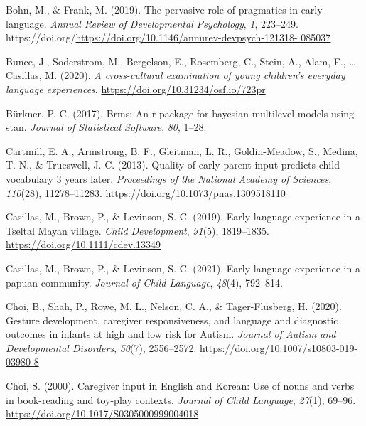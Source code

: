 \documentclass[
  man,floatsintext]{apa6}
\newlength{\cslhangindent}
\newlength{\cslentryspacingunit} %
\newenvironment{CSLReferences}[2] %
 {%
  \setlength{\parindent}{0pt}
  \ifodd #1
  \let\oldpar\par
  \def\par{\hangindent=\cslhangindent\oldpar}
  \fi
  \setlength{\parskip}{#2\cslentryspacingunit}
 }%
 {}
\begin{document}
\begin{CSLReferences}{1}{0}
\leavevmode{}%
Bohn, M., \& Frank, M. (2019). The pervasive role of pragmatics in early language. \emph{Annual Review of Developmental Psychology}, \emph{1}, 223--249. https://doi.org/\href{https://doi.org/10.1146/annurev-devpsych-121318-\%20085037}{https://doi.org/10.1146/annurev-devpsych-121318- 085037}

\leavevmode{}%
Bunce, J., Soderstrom, M., Bergelson, E., Rosemberg, C., Stein, A., Alam, F., \ldots{} Casillas, M. (2020). \emph{A cross-cultural examination of young children's everyday language experiences}. \url{https://doi.org/10.31234/osf.io/723pr}

\leavevmode{}%
Bürkner, P.-C. (2017). Brms: An r package for bayesian multilevel models using stan. \emph{Journal of Statistical Software}, \emph{80}, 1--28.

\leavevmode{}%
Cartmill, E. A., Armstrong, B. F., Gleitman, L. R., Goldin-Meadow, S., Medina, T. N., \& Trueswell, J. C. (2013). Quality of early parent input predicts child vocabulary 3 years later. \emph{Proceedings of the National Academy of Sciences}, \emph{110}(28), 11278--11283. \url{https://doi.org/10.1073/pnas.1309518110}

\leavevmode{}%
Casillas, M., Brown, P., \& Levinson, S. C. (2019). Early language experience in a {Tseltal} {Mayan} village. \emph{Child Development}, \emph{91}(5), 1819--1835. \url{https://doi.org/10.1111/cdev.13349}

\leavevmode{}%
Casillas, M., Brown, P., \& Levinson, S. C. (2021). Early language experience in a papuan community. \emph{Journal of Child Language}, \emph{48}(4), 792--814.

\leavevmode{}%
Choi, B., Shah, P., Rowe, M. L., Nelson, C. A., \& Tager-Flusberg, H. (2020). Gesture development, caregiver responsiveness, and language and diagnostic outcomes in infants at high and low risk for {Autism}. \emph{Journal of Autism and Developmental Disorders}, \emph{50}(7), 2556--2572. \url{https://doi.org/10.1007/s10803-019-03980-8}

\leavevmode{}%
Choi, S. (2000). Caregiver input in {English} and {Korean}: Use of nouns and verbs in book-reading and toy-play contexts. \emph{Journal of Child Language}, \emph{27}(1), 69--96. \url{https://doi.org/10.1017/S0305000999004018}


\end{CSLReferences}
\end{document}
